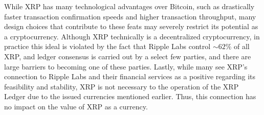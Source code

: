 \documentclass[11pt,a4paper]{article}
\begin{document}
	While XRP has many technological advantages over Bitcoin, such as drastically faster transaction confirmation speeds and higher transaction throughput, many design choices that contribute to these feats may severely restrict its potential as a cryptocurrency. Although XRP technically is a decentralized cryptocurrency, in practice this ideal is violated by the fact that Ripple Labs control $\sim62\%$ of all XRP, and ledger consensus is carried out by a select few parties, and there are large barriers to becoming one of these parties. Lastly, while many see XRP's connection to Ripple Labs and their financial services as a positive regarding its feasibility and stability, XRP is not necessary to the operation of the XRP Ledger due to the issued currencies mentioned earlier. Thus, this connection has no impact on the value of XRP as a currency.
	
	
	
\end{document}
